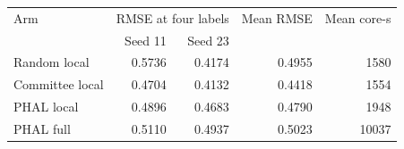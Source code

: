 \begin{tabular}{lrrrr}
\toprule
Arm & \multicolumn{2}{c}{RMSE at four labels} & Mean RMSE & Mean core-s \\
& Seed 11 & Seed 23 & & \\
\midrule
Random local & 0.5736 & 0.4174 & 0.4955 & 1580 \\
Committee local & 0.4704 & 0.4132 & 0.4418 & 1554 \\
PHAL local & 0.4896 & 0.4683 & 0.4790 & 1948 \\
PHAL full & 0.5110 & 0.4937 & 0.5023 & 10037 \\
\bottomrule
\end{tabular}

